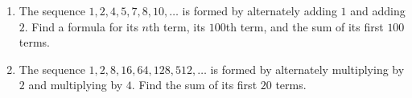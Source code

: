 \begin{enumerate}
\item[(a)] The sequence $1,2,4,5,7,8,10,\dots$ is formed by alternately adding $1$ and adding $2$. Find a formula for its $n$th term, its $100$th term, and the sum of its first $100$ terms.
\item[(b)] The sequence $1,2,8,16,64,128,512,\dots$ is formed by alternately multiplying by $2$ and multiplying by $4$. Find the sum of its first $20$ terms.
\end{enumerate}
